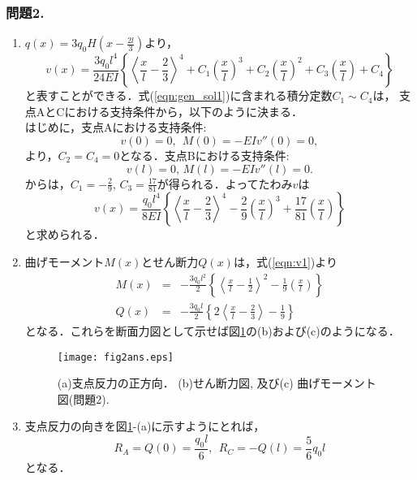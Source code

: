 \documentclass[10pt,a4j]{jarticle}
\begin{document}
\subsubsection*{問題2. }
\begin{enumerate}
\item
	$q(x)=3q_0H\left(x-\frac{2l}{3}\right)$より，
\begin{equation}
	v(x)=\frac{3q_0l^4}{24EI}\left\{
			\left< \frac{x}{l} -\frac{2}{3} \right>^4
			+
			C_1\left(\frac{x}{l}\right)^3
			+
			C_2\left(\frac{x}{l}\right)^2
			+
			C_3\left(\frac{x}{l}\right)
			+
			C_4
		\right\}
		\label{eqn:gen_sol1}
\end{equation}
と表すことができる．式(\ref{eqn:gen_sol1})に含まれる積分定数$C_1\sim C_4$は，
支点AとCにおける支持条件から，以下のように決まる．\\
はじめに，支点Aにおける支持条件:
\begin{equation}
	v(0)=0, \ \ M(0)=-EIv''(0) =0,
	\label{eqn:BC1_A}
\end{equation}
より，$C_2=C_4=0$となる．支点Bにおける支持条件:
\begin{equation}
	v(l) =0, \, M(l)=-EIv''(l)=0.
	\label{eqn:BC1_B}
\end{equation}
からは，$C_1=-\frac{2}{9},\, C_3=\frac{17}{81}$が得られる．よってたわみ$v$は
\begin{equation}
	v(x)=\frac{q_0l^4}{8EI}\left\{
			\left< \frac{x}{l} -\frac{2}{3} \right>^4
			-
			\frac{2}{9}	
			\left(\frac{x}{l}\right)^3
			+
			\frac{17}{81}	
			\left(\frac{x}{l}\right)
			\right\}
	\label{eqn:v1}
\end{equation}
と求められる．
\item
曲げモーメント$M(x)$とせん断力$Q(x)$は，式(\ref{eqn:v1})より
\begin{eqnarray}
	M(x) &=& 
		-\frac{3q_0l^2}{2}
		\left\{	
			\left< \frac{x}{l} -\frac{1}{2} \right>^2
			-
			\frac{1}{9}
			\left(\frac{x}{l}\right)
		\right\}
	\label{eqn:M1}
	\\
	Q(x) &=&
		-\frac{3q_0l}{2}
		\left\{
		2 \left<\frac{x}{l} -\frac{2}{3}\right>
		-\frac{1}{9}
		\right\}
	\label{eqn:Q1}
\end{eqnarray}
となる．これらを断面力図として示せば図\ref{fig:fig2}の(b)および(c)のようになる．
\begin{figure}[h]
	\begin{center}
	\texttt{[image: fig2ans.eps]} 
	\end{center}
	\vspace{-5mm}
	\caption{(a)支点反力の正方向．
	(b)せん断力図, 及び(c) 曲げモーメント図(問題2).}
	\label{fig:fig2}
\end{figure}
\item
支点反力の向きを図\ref{fig:fig2}-(a)に示すようにとれば，
\begin{equation}
	R_A =  Q(0) = \frac{q_0l}{6}, \ \ 
	R_C = -Q(l) = \frac{5}{6}q_0l
\end{equation}
となる．
\end{enumerate}
\end{document}
